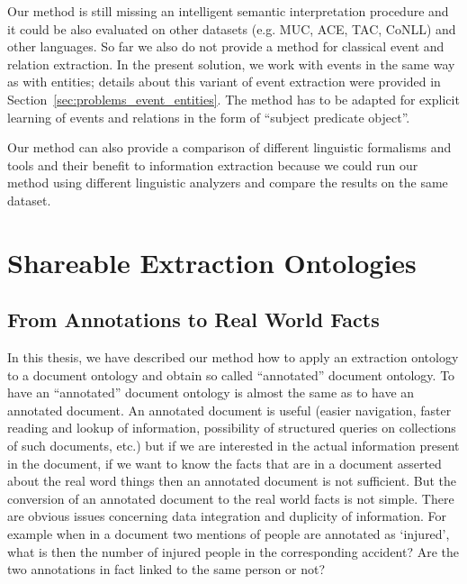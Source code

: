 Our method is still missing an intelligent semantic interpretation procedure and it could be also evaluated on other datasets (e.g. MUC, ACE, TAC, CoNLL) and other languages. So far we also do not provide a method for classical event and relation extraction. %
In the present solution, we work with events in the same way as with entities; details about this variant of event extraction were provided in Section~\ref{sec:problems_event_entities}. The method has to be adapted for explicit learning of events and relations in the form of ``subject predicate object''.

Our method can also provide a comparison of different linguistic formalisms and tools and their benefit to information extraction because we could run our method using different linguistic analyzers and compare the results on the same dataset.



\section{Shareable Extraction Ontologies} 

\subsection{From Annotations to Real World Facts} \label{sec:onto_discuss}


In this thesis, we have described our method how to apply an extraction ontology to a document ontology and obtain so called ``annotated'' document ontology. To have an ``annotated'' document ontology is almost the same as to have an annotated document. An annotated document is useful (easier navigation, faster reading and lookup of information, possibility of structured queries on collections of such documents, etc.) but if we are interested in the actual information present in the document, if we want to know the facts that are in a document asserted about the real word things then an annotated document is not sufficient. But the conversion of an annotated document to the real world facts is not simple.
There are obvious issues concerning data integration and duplicity of information. For example when in a document two mentions of people are annotated as `injured', what is then the number of injured people in the corresponding accident? Are the two annotations in fact linked to the same person or not?


